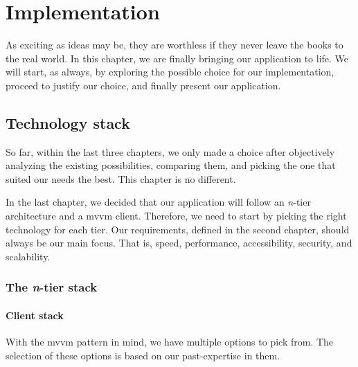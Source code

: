 \chapter{Implementation}
\label{chap:implementation}

As exciting as ideas may be, they are worthless if they never leave the books to the real world.
In this chapter, we are finally bringing our application to life.
We will start, as always, by exploring the possible choice for our implementation, proceed to justify our choice, and finally present our application.

\section{Technology stack}

So far, within the last three chapters, we only made a choice after objectively analyzing the existing possibilities, comparing them, and picking the one that suited our needs the best.
This chapter is no different.

In the last chapter, we decided that our application will follow an \emph{n}-tier architecture and a \acrshort{mvvm} client.
Therefore, we need to start by picking the right technology for each tier.
Our requirements, defined in the second chapter, should always be our main focus.
That is, speed, performance, accessibility, security, and scalability.

\subsection{The \emph{n}-tier stack}
\subsubsection{Client stack}

With the \acrshort{mvvm} pattern in mind, we have multiple options to pick from.
The selection of these options is based on our past-expertise in them.

